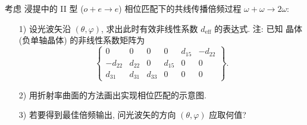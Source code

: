 \documentclass{assignment}
\begin{document}
\begin{prob}
    考虑  浸提中的 II 型 ($o+e\rightarrow e$) 相位匹配下的共线传播倍频过程 $\omega+\omega\rightarrow 2\omega$:
    \begin{itemize}
        \item[1)] 设光波矢沿 $(\theta,\varphi)$, 求出此时有效非线性系数 $d_{\text{eff}}$ 的表达式.
        注: 已知  晶体 (负单轴晶体) 的非线性系数矩阵为
        \[
            \begin{Bmatrix}
                0&0&0&0&d_{15}&-d_{22}\\
                -d_{22}&d_{22}&0&d_{15}&0&0\\
                d_{31}&d_{31}&d_{33}&0&0&0
            \end{Bmatrix}.
        \]
        \item[2)] 用折射率曲面的方法画出实现相位匹配的示意图.
        \item[3)] 若要得到最佳倍频输出, 问光波矢的方向 $(\theta,\varphi)$ 应取何值?
    \end{itemize}
\end{prob}
\end{document}
